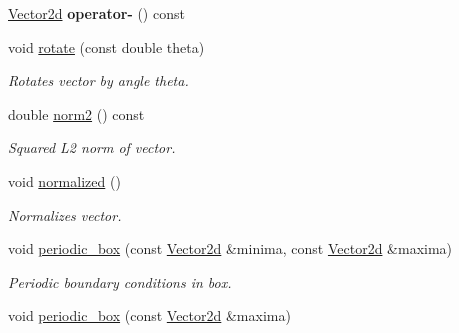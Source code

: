 \begin{DoxyCompactItemize}
\item 
\mbox{\label{classtopology_1_1Vector2d_a1102eecb016c3a632a711f4d2721471e}} 
\mbox{\hyperlink{classtopology_1_1Vector2d}{Vector2d}} {\bfseries operator-\/} () const
\item 
\mbox{\label{classtopology_1_1Vector2d_a9d3418e85e9c079c5aed2c0042fa696b}} 
void \mbox{\hyperlink{classtopology_1_1Vector2d_a9d3418e85e9c079c5aed2c0042fa696b}{rotate}} (const double theta)
\begin{DoxyCompactList}\small\item\em Rotates vector by angle theta. \end{DoxyCompactList}\item 
\mbox{\label{classtopology_1_1Vector2d_a41391cc6bd8a179b5c9bd64be6302ffc}} 
double \mbox{\hyperlink{classtopology_1_1Vector2d_a41391cc6bd8a179b5c9bd64be6302ffc}{norm2}} () const
\begin{DoxyCompactList}\small\item\em Squared L2 norm of vector. \end{DoxyCompactList}\item 
\mbox{\label{classtopology_1_1Vector2d_aa34fc52ec93f607a4a6b2033e4c6d2db}} 
void \mbox{\hyperlink{classtopology_1_1Vector2d_aa34fc52ec93f607a4a6b2033e4c6d2db}{normalized}} ()
\begin{DoxyCompactList}\small\item\em Normalizes vector. \end{DoxyCompactList}\item 
void \mbox{\hyperlink{classtopology_1_1Vector2d_acbc60af5c9b08102b168e9606d01bbab}{periodic\+\_\+box}} (const \mbox{\hyperlink{classtopology_1_1Vector2d}{Vector2d}} \&minima, const \mbox{\hyperlink{classtopology_1_1Vector2d}{Vector2d}} \&maxima)
\begin{DoxyCompactList}\small\item\em Periodic boundary conditions in box. \end{DoxyCompactList}\item 
\mbox{\label{classtopology_1_1Vector2d_a5b1283e5509f49a556117c84e94a55ee}} 
void \mbox{\hyperlink{classtopology_1_1Vector2d_a5b1283e5509f49a556117c84e94a55ee}{periodic\+\_\+box}} (const \mbox{\hyperlink{classtopology_1_1Vector2d}{Vector2d}} \&maxima)

\end{DoxyCompactItemize}
